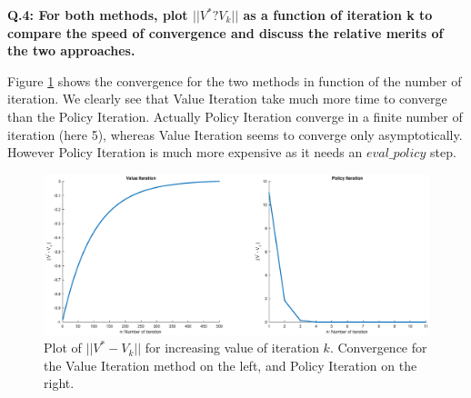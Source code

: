 \documentclass[a4paper,11pt]{exam}
\begin{document}
\textbf{Q.4: For both methods, plot $||V^{*} ? V_{k}||$ as a function of iteration k to compare the speed of convergence and discuss the relative merits of the two approaches.\\}

Figure \ref{vstar_vk} shows the convergence for the two methods in function of the number of iteration. We clearly see that Value Iteration take much more time to converge than the Policy Iteration. Actually Policy Iteration converge in a finite number of iteration (here 5), whereas Value Iteration seems to converge only asymptotically. However Policy Iteration is much more expensive as it needs an $eval\_policy$ step.\\

\begin{figure}[!h]
\centering
\includegraphics[width=16cm]{figures/vstar_vk.eps}
\caption{Plot of $||V^{*} - V_{k}||$ for increasing value of iteration $k$. Convergence for the Value Iteration method on the left, and Policy Iteration on the right.}    
\label{vstar_vk}
\end{figure}


\clearpage







\end{document}
